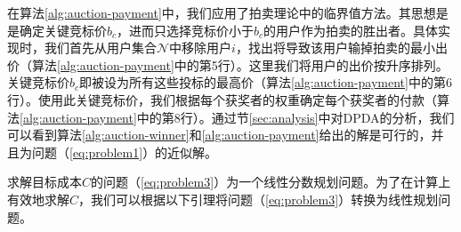 	在算法\ref{alg:auction-payment}中，我们应用了拍卖理论\cite{milgrom2004putting}中的临界值方法。其思想是是确定关键竞标价$b_c$，进而只选择竞标价小于$b_c$的用户作为拍卖的胜出者。具体实现时，我们首先从用户集合$\mathcal{N}$中移除用户$i$，找出将导致该用户输掉拍卖的最小出价（算法\ref{alg:auction-payment}中的第5行）。这里我们将用户的出价按升序排列。关键竞标价$b_c$即被设为所有这些投标的最高价（算​​法\ref{alg:auction-payment}中的第6行）。使用此关键竞标价，我们根据每个获奖者的权重确定每个获奖者的付款（算法\ref{alg:auction-payment}中的第8行）。通过节\ref{sec:analysis}中对DPDA的分析，我们可以看到算法\ref{alg:auction-winner}和\ref{alg:auction-payment}给出的解是可行的，并且为问题（\ref{eq:problem1}）的近似解。

	
	
	
	求解目标成本$C$的问题（\ref{eq:problem3}）为一个线性分数规划问题。为了在计算上有效地求解$C$，我们可以根据以下引理将问题（\ref{eq:problem3}）转换为线性规划问题。
	
